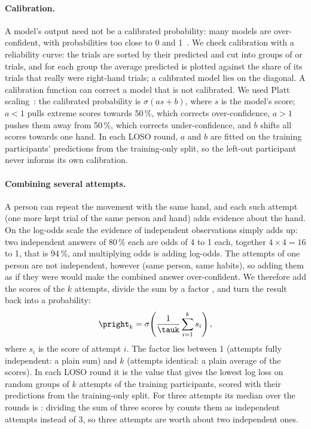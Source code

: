 \paragraph{Calibration.} A model's output need not be a calibrated probability: many models are over-confident, with
probabilities too close to 0 and 1~\cite{guo2017calibration}. We check calibration with a reliability curve: the trials are
sorted by their predicted \pright{} and cut into  groups of 
or  trials, and for each group the average predicted \pright{} is plotted against the
share of its trials that really were right-hand trials; a calibrated model lies on the diagonal. A calibration function
can correct a model that is not calibrated. We used Platt scaling~\cite{platt1999probabilistic}: the calibrated
probability is $\sigma(a s + b)$, where $s$ is the model's score; $a < 1$ pulls extreme scores towards 50\,\%,
which corrects over-confidence, $a > 1$ pushes them away from 50\,\%, which corrects under-confidence, and $b$ shifts
all scores towards one hand. In each LOSO round, $a$ and $b$ are fitted on the training participants' predictions from
the training-only split, so the left-out participant never informs its own calibration.

\paragraph{Combining several attempts.} A person can repeat the movement with the same hand, and each such attempt
(one more kept trial of the same person and hand) adds evidence about the hand. On the log-odds scale the evidence of
independent observations simply adds up: two independent answers of 80\,\% each are odds of 4 to 1 each, together
$4 \times 4 = 16$ to 1, that is 94\,\%, and multiplying odds is adding log-odds. The attempts of one person are not
independent, however (same person, same habits), so adding them as if they were would make the combined answer
over-confident. We therefore add the scores of the $k$ attempts, divide the sum by a factor \tauk{}, and turn the
result back into a probability:
\begin{equation}
  \pright_k = \sigma\!\left(\frac{1}{\tauk}\sum_{i=1}^{k} s_i\right),
  \label{eq:aggregate}
\end{equation}
where $s_i$ is the score of attempt $i$. The factor \tauk{} lies between 1 (attempts fully independent: a plain sum)
and $k$ (attempts identical: a plain average of the scores). In each LOSO round it is the value that gives the lowest
log loss on random groups of $k$ attempts of the training participants, scored with their predictions from the
training-only split. For three attempts its median over the rounds is : dividing the sum of three
scores by  counts them as  independent attempts instead of 3, so three attempts
are worth about two independent ones.

